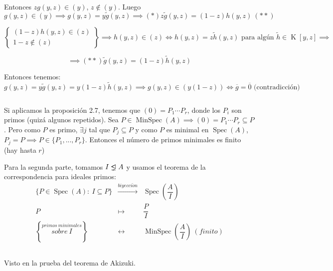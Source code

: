\documentclass[openany]{book}
\begin{document}
\begin{exercise}
    Entonces $ zg(y,z) \in (y) $, $ z \not \in (y) $. Luego $g(y,z) \in (y) \implies g(y,z) = y\widetilde{g}(y,z) \implies (*) z\widetilde{g} (y,z) = (1-z)h(y,z)\ (**)$

    $$ \left\{
    \begin{array}{l}
        (1-z) h(y,z) \in (z) \\
        1-z \not \in (z)
    \end{array}
    \right\} \implies h(y,z) \in (z) \iff h(y,z) = z\widetilde{h}(y,z) \text{ para algún } \widetilde{h} \in \operatorname{K}[y,z] \implies $$ 
    
    $$ \implies (**) \widetilde{g}(y,z) = (1-z)\widetilde{h}(y,z) $$

    Entonces tenemos:
    $$ g(y,z) = y\widetilde{g}(y,z) = y(1-z)\widetilde{h}(y,z) \implies g(y,z) \in (y(1-z))  \iff \overline{g} = \overline{0} \text{ (contradicción)}$$

\end{exercise}


\begin{exercise}
    $  $

    Si aplicamos la proposición 2.7, tenemos que $ (0) =  P_1\cdots P_{r} $, donde los $ P_i $ son primos (quizá algunos repetidos). Sea $ P \in \operatorname{MinSpec}(A) \implies (0) = P_1 \cdots P_{r} \subseteq  P$. Pero como $ P $ es primo, $ \exists j  $ tal que $ P_j \subseteq  P $ y como $ P $ es minimal en $ \operatorname{Spec}(A) $, $ P_j = P \implies P \in \{P_1,...,P_r\} $. Entonces el número de primos minimales es finito (hay hasta $ r $)

    Para la segunda parte, tomamos $ I \properideal A  $ y usamos el teorema de la correspondencia para ideales primos:
    $$ 
    \begin{aligned}
        \{P \in \operatorname{Spec}(A):\ I \subseteq P\} & \xrightarrow{biyecci\acute on} & \operatorname{Spec}(\dfrac{A}{I})\\
        P & \longmapsto & \dfrac{P}{I}\\ 
        \left\{\stackrel{primos\ minimales}{sobre\ I}\right\} & \leftrightarrow & \operatorname{MinSpec}\left(\dfrac{A}{I}\right)\  (finito)
    \end{aligned}
    $$
\end{exercise}

\begin{exercise}
    $  $

    Visto en la prueba del teorema de Akizuki.
\end{exercise}
\end{document}
